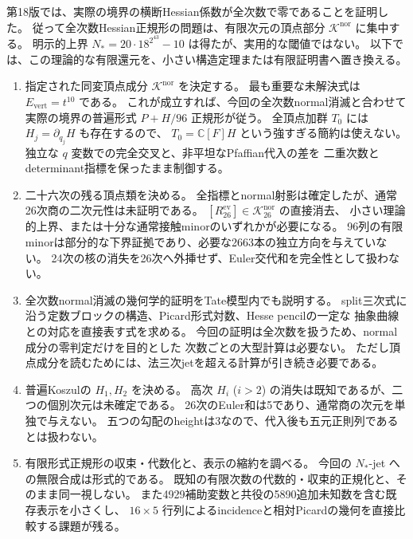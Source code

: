第18版では、実際の境界の横断Hessian係数が全次数で零であることを証明した。
従って全次数Hessian正規形の問題は、有限次元の頂点部分
$\mathcal K^{\mathrm{nor}}$ に集中する。
明示的上界 $N_*=20\cdot18^{2^{43}}-10$ は得たが、実用的な閾値ではない。
以下では、この理論的な有限還元を、小さい構造定理または有限証明書へ置き換える。
\begin{enumerate}
 \item 指定された同変頂点成分 $\mathcal K^{\mathrm{nor}}$ を決定する。
 最も重要な未解決式は $E_{\mathrm{vert}}=t^{10}$ である。
 これが成立すれば、今回の全次数normal消滅と合わせて
 実際の境界の普遍形式 $P+H/96$ 正規形が従う。
 全頂点加群 $T_0$ には $H_j=\partial_{q_j}H$ も存在するので、
 $T_0=\mathbb C[F]H$ という強すぎる簡約は使えない。
 独立な $q$ 変数での完全交叉と、非平坦なPfaffian代入の差を
 二重次数とdeterminant指標を保ったまま制御する。

 \item 二十六次の残る頂点類を決める。
 全指標とnormal射影は確定したが、通常26次商の二次元性は未証明である。
 $[R_{26}^{\mathrm{ev}}]\in\mathcal K_{26}^{\mathrm{nor}}$ の直接消去、
 小さい理論的上界、または十分な通常接触minorのいずれかが必要になる。
 96列の有限minorは部分的な下界証拠であり、必要な2663本の独立方向を与えていない。
 24次の核の消失を26次へ外挿せず、Euler交代和を完全性として扱わない。

 \item 全次数normal消滅の幾何学的証明をTate模型内でも説明する。
 split三次式に沿う定数ブロックの構造、Picard形式対数、Hesse pencilの一定な
 抽象曲線との対応を直接表す式を求める。
 今回の証明は全次数を扱うため、normal成分の零判定だけを目的とした
 次数ごとの大型計算は必要ない。
 ただし頂点成分を読むためには、法三次jetを超える計算が引き続き必要である。

 \item 普遍Koszulの $H_1,H_2$ を決める。
 高次 $H_i$ ($i>2$) の消失は既知であるが、二つの個別次元は未確定である。
 26次のEuler和は5であり、通常商の次元を単独で与えない。
 五つの勾配のheightは3なので、代入後も五元正則列であるとは扱わない。

 \item 有限形式正規形の収束・代数化と、表示の縮約を調べる。
 今回の $N_*$-jet への無限合成は形式的である。
 既知の有限次数の代数的・収束的正規化と、そのまま同一視しない。
 また4929補助変数と共役の5890追加未知数を含む既存表示を小さくし、
 $16\times5$ 行列によるincidenceと相対Picardの幾何を直接比較する課題が残る。


\end{enumerate}
